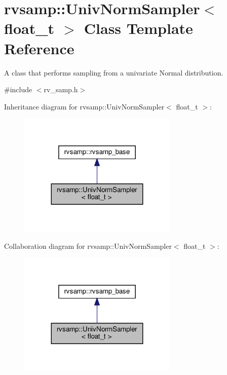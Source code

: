 \hypertarget{classrvsamp_1_1UnivNormSampler}{}\section{rvsamp\+:\+:Univ\+Norm\+Sampler$<$ float\+\_\+t $>$ Class Template Reference}
\label{classrvsamp_1_1UnivNormSampler}


A class that performs sampling from a univariate Normal distribution.  




{\ttfamily \#include $<$rv\+\_\+samp.\+h$>$}



Inheritance diagram for rvsamp\+:\+:Univ\+Norm\+Sampler$<$ float\+\_\+t $>$\+:\nopagebreak
\begin{figure}[H]
\begin{center}
\leavevmode
\includegraphics[width=215pt]{classrvsamp_1_1UnivNormSampler__inherit__graph}
\end{center}
\end{figure}


Collaboration diagram for rvsamp\+:\+:Univ\+Norm\+Sampler$<$ float\+\_\+t $>$\+:\nopagebreak
\begin{figure}[H]
\begin{center}
\leavevmode
\includegraphics[width=215pt]{classrvsamp_1_1UnivNormSampler__coll__graph}
\end{center}
\end{figure}
